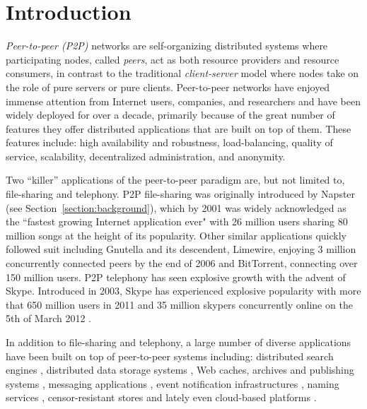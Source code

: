 \section{Introduction}
\label{section:intro}

\emph{Peer-to-peer (P2P)} networks are self-organizing distributed systems where
participating nodes, called \emph{peers}, act as both resource providers and
resource consumers, in contrast to the traditional \emph{client-server} model
where nodes take on the role of pure servers or pure clients. Peer-to-peer
networks have enjoyed immense attention from Internet users, companies, and
researchers and have been widely deployed for over a decade, primarily because
of the great number of features they offer distributed applications that are
built on top of them. These features include:  high availability and robustness,
load-balancing, quality of service, scalability, decentralized administration,
and anonymity. 

Two ``killer'' applications of the peer-to-peer paradigm are, but not limited
to, file-sharing and telephony. P2P file-sharing was originally introduced by
Napster (see Section~\ref{section:background}), which by 2001 was widely
acknowledged as the ``fastest growing Internet application ever" with 26 million
users sharing 80 million songs at the height of its popularity. Other similar
applications quickly followed suit including Gnutella and its descendent,
Limewire, enjoying 3 million concurrently connected peers by the end of 2006
and BitTorrent, connecting over 150 million users. P2P telephony has seen
explosive growth with the advent of Skype. Introduced in 2003, Skype has
experienced explosive popularity with more that 650 million users in 2011
\cite{skypetotalusers} and 35 million skypers concurrently online on the 5th of
March 2012 \cite{skypesymusers}.

In addition to file-sharing and telephony, a large number of diverse
applications have been built on top of peer-to-peer systems including:
distributed search engines \cite{yaci}, distributed data storage systems
\cite{kbc_oceanstore_2000,bdet_fsdfs_2000,dkkms_cfs_2001,dr_pastutility_2001,abc_farsite_2002,mmfc_ivy_2002,arla,agebh_dks_2003},
Web caches, archives and publishing systems
\cite{ird_squirrel_2002,bags_youserv_2002,wrc_publius_2000,wm_tangler_2001},
messaging applications \cite{threedegrees}, event notification infrastructures
\cite{rkcd_scribe_2001,cdkr_scribe_2002,agebh_dks_2003}, naming services
\cite{cmm_chorddns_2002}, censor-resistant stores \cite{cswh_freenet_2001} and
lately even cloud-based platforms \cite{mgpj_cloudsnap_2011}.

